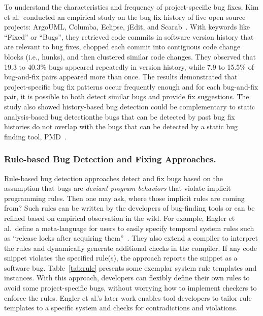 To understand the characteristics and frequency of project-specific bug fixes, Kim et al.~conducted an empirical study on the bug fix history of five open source projects: ArgoUML, Columba, Eclipse, jEdit, and Scarab~\cite{Kim2006:MBF}. With keywords like ``Fixed'' or ``Bugs'', they retrieved code commits in software version history that are relevant to bug fixes, chopped each commit into contiguous code change blocks (i.e., hunks), and then clustered similar code changes. They observed that 19.3 to 40.3\% bugs appeared repeatedly in version history, while 7.9 to 15.5\% of bug-and-fix pairs appeared more than once. The results demonstrated that project-specific bug fix patterns occur frequently enough and for each bug-and-fix pair, it is possible to both detect similar bugs and provide fix suggestions. The study also showed history-based bug detection could be complementary to static analysis-based bug detection\textemdash the bugs that can be detected by past bug fix histories do not overlap with the bugs that can be detected by a static bug finding tool, PMD~\cite{PMD}. 

\subsubsection{Rule-based Bug Detection and Fixing Approaches.}
Rule-based bug detection approaches detect and fix bugs based on the assumption that bugs are {\em deviant program behaviors} that violate implicit programming rules. Then one may ask, where those implicit rules are coming from? Such rules can be written by the developers of bug-finding tools or can be refined based on empirical observation in the wild. For example, Engler et al.~define a meta-language for users to easily specify temporal system rules such as ``release locks after acquiring them''~\cite{Engler2000:CSR}. They also extend a compiler to interpret the rules and dynamically generate additional checks in the compiler. If any code snippet violates the specified rule(s), the approach reports the snippet as a software bug. Table~\ref{tab:rule} presents some exemplar system rule templates and instances. With this approach, developers can flexibly define their own rules to avoid some project-specific bugs, without worrying how to implement checkers to enforce the rules. Engler et al.'s later work enables tool developers to tailor rule templates to a specific system and checks for contradictions and violations\cite{engler01bugs}.  

